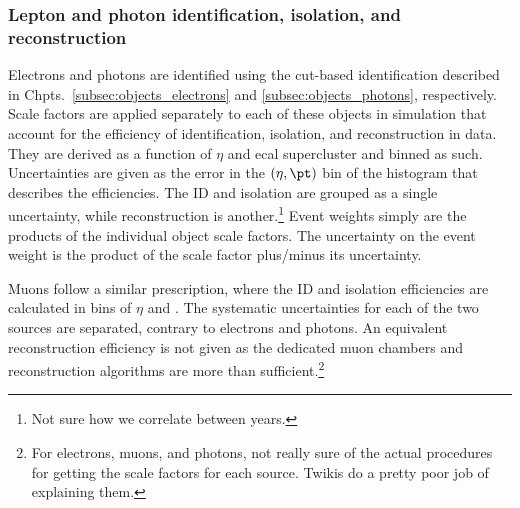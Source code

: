 

\subsubsection{Lepton and photon identification, isolation, and reconstruction}
\label{subsubsec:htoinv_lepton_id_iso_reco_systs}

Electrons and photons are identified using the cut-based identification described in Chpts.~\ref{subsec:objects_electrons} and \ref{subsec:objects_photons}, respectively. Scale factors are applied separately to each of these objects in simulation that account for the efficiency of identification, isolation, and reconstruction in data. They are derived as a function of $\eta$ and \acrshort{ecal} supercluster \pt and binned as such. Uncertainties are given as the error in the $(\eta, \pt)$ bin of the histogram that describes the efficiencies. The ID and isolation are grouped as a single uncertainty, while reconstruction is another.\footnote{Not sure how we correlate between years.} Event weights simply are the products of the individual object scale factors. The uncertainty on the event weight is the product of the scale factor plus/minus its uncertainty.



Muons follow a similar prescription, where the ID and isolation efficiencies are calculated in bins of $\eta$ and \pt. The systematic uncertainties for each of the two sources are separated, contrary to electrons and photons. An equivalent reconstruction efficiency is not given as the dedicated muon chambers and reconstruction algorithms are more than sufficient.\footnote{For electrons, muons, and photons, not really sure of the actual procedures for getting the scale factors for each source. Twikis do a pretty poor job of explaining them.}



